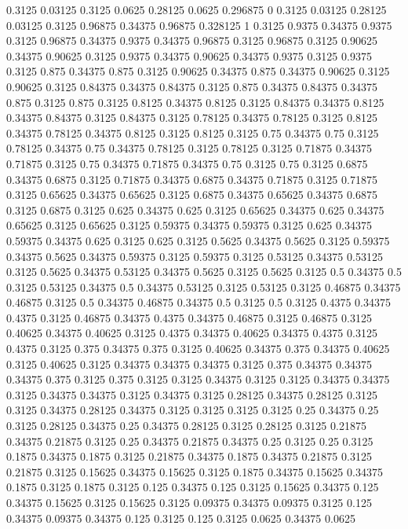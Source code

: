 0.3125 0.03125
0.3125 0.0625
0.28125 0.0625
0.296875 0
0.3125 0.03125
0.28125 0.03125
0.3125 0.96875
0.34375 0.96875
0.328125 1
0.3125 0.9375
0.34375 0.9375
0.3125 0.96875
0.34375 0.9375
0.34375 0.96875
0.3125 0.96875
0.3125 0.90625
0.34375 0.90625
0.3125 0.9375
0.34375 0.90625
0.34375 0.9375
0.3125 0.9375
0.3125 0.875
0.34375 0.875
0.3125 0.90625
0.34375 0.875
0.34375 0.90625
0.3125 0.90625
0.3125 0.84375
0.34375 0.84375
0.3125 0.875
0.34375 0.84375
0.34375 0.875
0.3125 0.875
0.3125 0.8125
0.34375 0.8125
0.3125 0.84375
0.34375 0.8125
0.34375 0.84375
0.3125 0.84375
0.3125 0.78125
0.34375 0.78125
0.3125 0.8125
0.34375 0.78125
0.34375 0.8125
0.3125 0.8125
0.3125 0.75
0.34375 0.75
0.3125 0.78125
0.34375 0.75
0.34375 0.78125
0.3125 0.78125
0.3125 0.71875
0.34375 0.71875
0.3125 0.75
0.34375 0.71875
0.34375 0.75
0.3125 0.75
0.3125 0.6875
0.34375 0.6875
0.3125 0.71875
0.34375 0.6875
0.34375 0.71875
0.3125 0.71875
0.3125 0.65625
0.34375 0.65625
0.3125 0.6875
0.34375 0.65625
0.34375 0.6875
0.3125 0.6875
0.3125 0.625
0.34375 0.625
0.3125 0.65625
0.34375 0.625
0.34375 0.65625
0.3125 0.65625
0.3125 0.59375
0.34375 0.59375
0.3125 0.625
0.34375 0.59375
0.34375 0.625
0.3125 0.625
0.3125 0.5625
0.34375 0.5625
0.3125 0.59375
0.34375 0.5625
0.34375 0.59375
0.3125 0.59375
0.3125 0.53125
0.34375 0.53125
0.3125 0.5625
0.34375 0.53125
0.34375 0.5625
0.3125 0.5625
0.3125 0.5
0.34375 0.5
0.3125 0.53125
0.34375 0.5
0.34375 0.53125
0.3125 0.53125
0.3125 0.46875
0.34375 0.46875
0.3125 0.5
0.34375 0.46875
0.34375 0.5
0.3125 0.5
0.3125 0.4375
0.34375 0.4375
0.3125 0.46875
0.34375 0.4375
0.34375 0.46875
0.3125 0.46875
0.3125 0.40625
0.34375 0.40625
0.3125 0.4375
0.34375 0.40625
0.34375 0.4375
0.3125 0.4375
0.3125 0.375
0.34375 0.375
0.3125 0.40625
0.34375 0.375
0.34375 0.40625
0.3125 0.40625
0.3125 0.34375
0.34375 0.34375
0.3125 0.375
0.34375 0.34375
0.34375 0.375
0.3125 0.375
0.3125 0.3125
0.34375 0.3125
0.3125 0.34375
0.34375 0.3125
0.34375 0.34375
0.3125 0.34375
0.3125 0.28125
0.34375 0.28125
0.3125 0.3125
0.34375 0.28125
0.34375 0.3125
0.3125 0.3125
0.3125 0.25
0.34375 0.25
0.3125 0.28125
0.34375 0.25
0.34375 0.28125
0.3125 0.28125
0.3125 0.21875
0.34375 0.21875
0.3125 0.25
0.34375 0.21875
0.34375 0.25
0.3125 0.25
0.3125 0.1875
0.34375 0.1875
0.3125 0.21875
0.34375 0.1875
0.34375 0.21875
0.3125 0.21875
0.3125 0.15625
0.34375 0.15625
0.3125 0.1875
0.34375 0.15625
0.34375 0.1875
0.3125 0.1875
0.3125 0.125
0.34375 0.125
0.3125 0.15625
0.34375 0.125
0.34375 0.15625
0.3125 0.15625
0.3125 0.09375
0.34375 0.09375
0.3125 0.125
0.34375 0.09375
0.34375 0.125
0.3125 0.125
0.3125 0.0625
0.34375 0.0625
